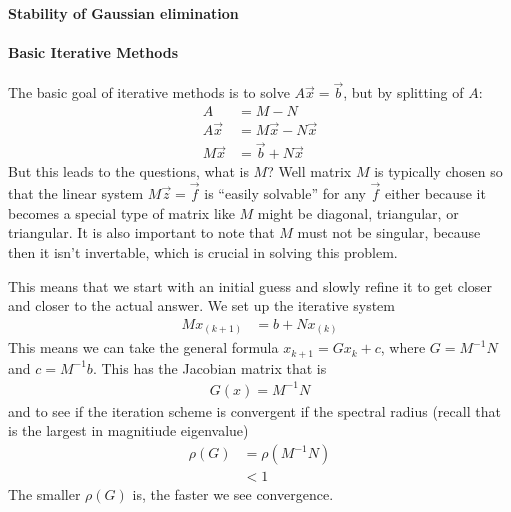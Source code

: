 \documentclass[a4paper,12pt]{article} %
\begin{document}
\paragraph{Stability of Gaussian elimination}
\paragraph{Basic Iterative Methods}
The basic goal of iterative methods is to solve $A\vec{x} = \vec{b}$, but by splitting of $A$:
\begin{align}
	A &= M - N\\
	A\vec{x} &= M\vec{x} - N\vec{x}\\
	M\vec{x} &= \vec{b} + N\vec{x}
\end{align}
But this leads to the questions, what is $M$? Well matrix $M$ is typically chosen so that the linear system $M\vec{z} = \vec{f}$ is ``easily solvable'' for any $\vec{f}$ either because it becomes a special type of matrix like $M$ might be diagonal, triangular, or triangular. It is also important to note that $M$ must not be singular, because then it isn't invertable, which is crucial in solving this problem. 

This means that we start with an initial guess and slowly refine it to get closer and closer to the actual answer. We set up the iterative system
\begin{align}
	Mx_{(k+1)} &= b + Nx_{(k)}
\end{align}
This means we can take the general formula $x_{k+1} = Gx_k + c$, where $G = M^{-1}N$ and $c = M^{-1}b$.
This has the Jacobian matrix that is 
\begin{align}
	G(x) = M^{-1}N
\end{align}
and to see if the iteration scheme is convergent if the spectral radius (recall that is the largest in magnitiude eigenvalue)
\begin{align}
	\rho(G) &= \rho(M^{-1}N)\\
	&< 1
\end{align}
The smaller $\rho(G)$ is, the faster we see convergence. 
\end{document}
